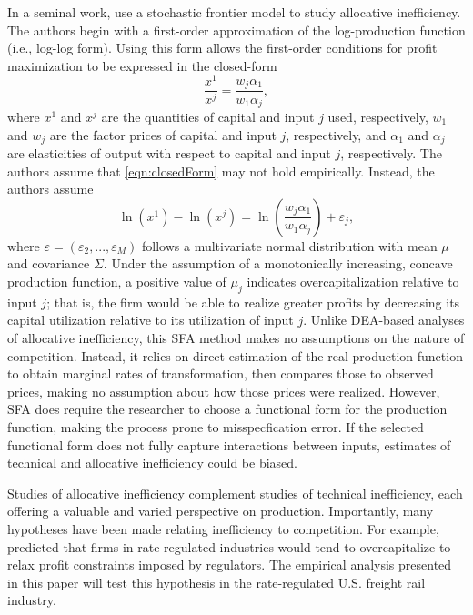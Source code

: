\documentclass[twocolumn]{article}
\newcommand{\ep}{\varepsilon}
\begin{document}
In a seminal work, \cite{LovellSchmidt} use a stochastic frontier model to study allocative inefficiency. The authors begin with a first-order approximation of the log-production function (i.e., log-log form). Using this form allows the first-order conditions for profit maximization to be expressed in the closed-form
\begin{equation}
	\label{eqn:closedForm}
	\frac{x^1}{x^j} = \frac{w_j\alpha_1}{w_1\alpha_j},
\end{equation}
where $x^1$ and $x^j$ are the quantities of capital and input $j$ used, respectively, $w_1$ and $w_j$ are the factor prices of capital and input $j$, respectively, and $\alpha_1$ and $\alpha_j$ are elasticities of output with respect to capital and input $j$, respectively. The authors assume that \cref{eqn:closedForm} may not hold empirically. Instead, the authors assume
\begin{equation}
	\ln(x^1) - \ln(x^j) = \ln\left(\frac{w_j\alpha_1}{w_1\alpha_j}\right) + \ep_j,
\end{equation}
where $\ep = (\ep_2, ..., \ep_M)$ follows a multivariate normal distribution with mean $\mu$ and covariance $\Sigma$. Under the assumption of a monotonically increasing, concave production function, a positive value of $\mu_j$ indicates overcapitalization relative to input $j$; that is, the firm would be able to realize greater profits by decreasing its capital utilization relative to its utilization of input $j$. Unlike DEA-based analyses of allocative inefficiency, this SFA method makes no assumptions on the nature of competition. Instead, it relies on direct estimation of the real production function to obtain marginal rates of transformation, then compares those to observed prices, making no assumption about how those prices were realized. However, SFA does require the researcher to choose a functional form for the production function, making the process prone to misspecfication error. If the selected functional form does not fully capture interactions between inputs, estimates of technical and allocative inefficiency could be biased.

Studies of allocative inefficiency complement studies of technical inefficiency, each offering a valuable and varied perspective on production. Importantly, many hypotheses have been made relating inefficiency to competition. For example, \cite{AverchJohnson} predicted that firms in rate-regulated industries would tend to overcapitalize to relax profit constraints imposed by regulators. The empirical analysis presented in this paper will test this hypothesis in the rate-regulated U.S. freight rail industry.
\end{document}
